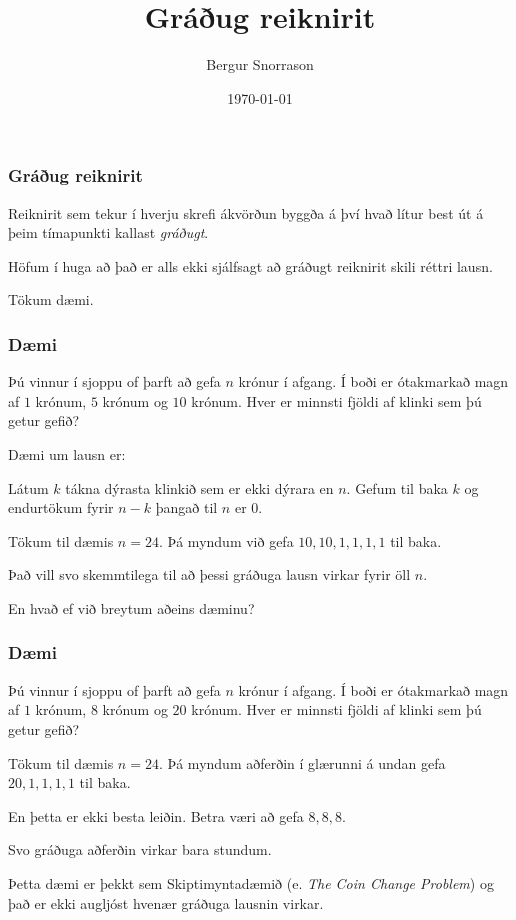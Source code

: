 \title{Gráðug reiknirit}
\author{Bergur Snorrason}
\date{\today}



\frame{\titlepage}

{
	\frametitle{Gráðug reiknirit}
	{
		\item<1-> Reiknirit sem tekur í hverju skrefi ákvörðun byggða á því hvað lítur best út á þeim tímapunkti kallast \emph{gráðugt}.
		\item<2-> Höfum í huga að það er alls ekki sjálfsagt að gráðugt reiknirit skili réttri lausn.
		\item<3-> Tökum dæmi.
	}
}

{
	\frametitle{Dæmi}
	{
		\item<1-> 
			Þú vinnur í sjoppu of þarft að gefa $n$ krónur í afgang. 
			Í boði er ótakmarkað magn af $1$ krónum, $5$ krónum og $10$ krónum.
			Hver er minnsti fjöldi af klinki sem þú getur gefið?
		\item<2-> Dæmi um lausn er:
		\item<3-> Látum $k$ tákna dýrasta klinkið sem er ekki dýrara en $n$. Gefum til baka $k$ og endurtökum fyrir $n - k$ þangað til $n$ er $0$.
		\item<4-> Tökum til dæmis $n = 24$. Þá myndum við gefa $10, 10, 1, 1, 1, 1$ til baka.
		\item<5-> Það vill svo skemmtilega til að þessi gráðuga lausn virkar fyrir öll $n$.
		\item<6-> En hvað ef við breytum aðeins dæminu?
	}
}

{
	\frametitle{Dæmi}
	{
		\item<1-> 
			Þú vinnur í sjoppu of þarft að gefa $n$ krónur í afgang. 
			Í boði er ótakmarkað magn af $1$ krónum, $8$ krónum og $20$ krónum.
			Hver er minnsti fjöldi af klinki sem þú getur gefið?
		\item<2-> Tökum til dæmis $n = 24$. Þá myndum aðferðin í glærunni á undan gefa $20, 1, 1, 1, 1$ til baka.
		\item<3-> En þetta er ekki besta leiðin. Betra væri að gefa $8, 8, 8$.
		\item<4-> Svo gráðuga aðferðin virkar bara stundum.
		\item<5-> Þetta dæmi er þekkt sem Skiptimyntadæmið (e. \emph{The Coin Change Problem}) og það er ekki augljóst hvenær gráðuga lausnin virkar.
	}
}

